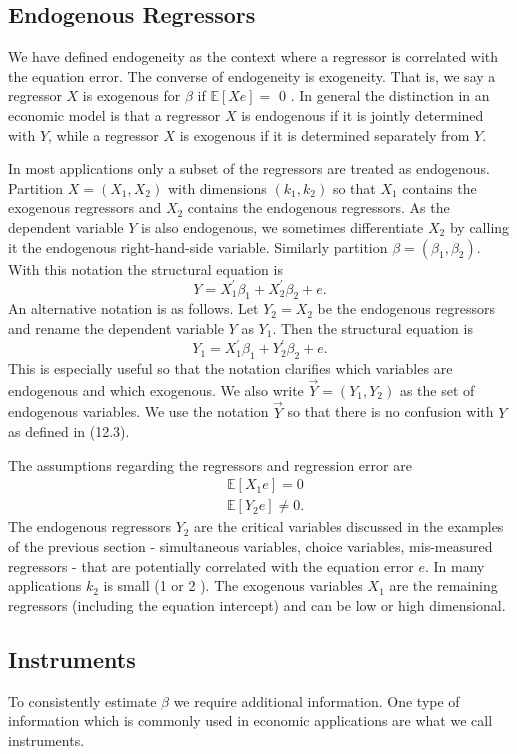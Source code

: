 \documentclass[10pt]{article}
\begin{document}
\subsection{Endogenous Regressors}
We have defined endogeneity as the context where a regressor is correlated with the equation error. The converse of endogeneity is exogeneity. That is, we say a regressor $X$ is exogenous for $\beta$ if $\mathbb{E}[X e]=$ 0 . In general the distinction in an economic model is that a regressor $X$ is endogenous if it is jointly determined with $Y$, while a regressor $X$ is exogenous if it is determined separately from $Y$.

In most applications only a subset of the regressors are treated as endogenous. Partition $X=\left(X_{1}, X_{2}\right)$ with dimensions $\left(k_{1}, k_{2}\right)$ so that $X_{1}$ contains the exogenous regressors and $X_{2}$ contains the endogenous regressors. As the dependent variable $Y$ is also endogenous, we sometimes differentiate $X_{2}$ by calling it the endogenous right-hand-side variable. Similarly partition $\beta=\left(\beta_{1}, \beta_{2}\right)$. With this notation the structural equation is
$$
Y=X_{1}^{\prime} \beta_{1}+X_{2}^{\prime} \beta_{2}+e .
$$
An alternative notation is as follows. Let $Y_{2}=X_{2}$ be the endogenous regressors and rename the dependent variable $Y$ as $Y_{1}$. Then the structural equation is
$$
Y_{1}=X_{1}^{\prime} \beta_{1}+Y_{2}^{\prime} \beta_{2}+e .
$$
This is especially useful so that the notation clarifies which variables are endogenous and which exogenous. We also write $\vec{Y}=\left(Y_{1}, Y_{2}\right)$ as the set of endogenous variables. We use the notation $\vec{Y}$ so that there is no confusion with $Y$ as defined in (12.3).

The assumptions regarding the regressors and regression error are
$$
\begin{aligned}
&\mathbb{E}\left[X_{1} e\right]=0 \\
&\mathbb{E}\left[Y_{2} e\right] \neq 0 .
\end{aligned}
$$
The endogenous regressors $Y_{2}$ are the critical variables discussed in the examples of the previous section - simultaneous variables, choice variables, mis-measured regressors - that are potentially correlated with the equation error $e$. In many applications $k_{2}$ is small (1 or 2 ). The exogenous variables $X_{1}$ are the remaining regressors (including the equation intercept) and can be low or high dimensional.

\subsection{Instruments}
To consistently estimate $\beta$ we require additional information. One type of information which is commonly used in economic applications are what we call instruments.
\end{document}

